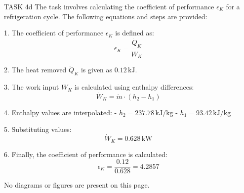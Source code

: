 TASK 4d  
The task involves calculating the coefficient of performance \( \epsilon_K \) for a refrigeration cycle. The following equations and steps are provided:

1. The coefficient of performance \( \epsilon_K \) is defined as:  
   \[
   \epsilon_K = \frac{\dot{Q}_K}{\dot{W}_K}
   \]

2. The heat removed \( \dot{Q}_K \) is given as \( 0.12 \, \text{kJ} \).

3. The work input \( \dot{W}_K \) is calculated using enthalpy differences:  
   \[
   \dot{W}_K = \dot{m} \cdot (h_2 - h_1)
   \]

4. Enthalpy values are interpolated:  
   - \( h_2 = 237.78 \, \text{kJ/kg} \)  
   - \( h_1 = 93.42 \, \text{kJ/kg} \)

5. Substituting values:  
   \[
   \dot{W}_K = 0.628 \, \text{kW}
   \]

6. Finally, the coefficient of performance is calculated:  
   \[
   \epsilon_K = \frac{0.12}{0.628} = 4.2857
   \]

No diagrams or figures are present on this page.
